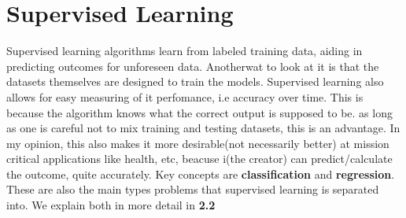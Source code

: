 \documentclass[11pt, a4paper]{article}
\begin{document}
\section{Supervised Learning}
Supervised learning algorithms learn from labeled training data, aiding in predicting outcomes for unforeseen data. Anotherwat to look at it is that the datasets themselves are designed to train the models. Supervised learning also allows for easy measuring of it perfomance, i.e accuracy over time. This is because the algorithm knows what the correct output is supposed to be. as long as one is careful not to mix training and testing datasets, this is an advantage. In my opinion, this also makes it more desirable(not necessarily better) at mission critical applications like health, etc, beacuse i(the creator) can predict/calculate the outcome, quite accurately.
 Key concepts are \textbf{classification} and \textbf{regression}. These are also the main types problems that supervised learning is separated into. We explain both in more detail in \textbf{2.2}
\end{document}
